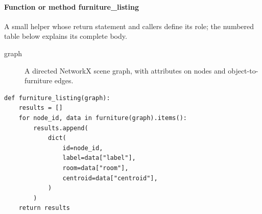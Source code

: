 \documentclass[11pt,a4paper]{book}
\begin{document}
\paragraph{Function or method furniture\_listing}
A small helper whose return statement and callers define its role; the numbered table below explains its complete body.

\begin{description}
\item[graph] A directed NetworkX scene graph, with attributes on nodes and object-to-furniture edges.
\end{description}

\begin{lstlisting}[firstnumber=91]
def furniture_listing(graph):
    results = []
    for node_id, data in furniture(graph).items():
        results.append(
            dict(
                id=node_id,
                label=data["label"],
                room=data["room"],
                centroid=data["centroid"],
            )
        )
    return results


\end{lstlisting}
\end{document}
